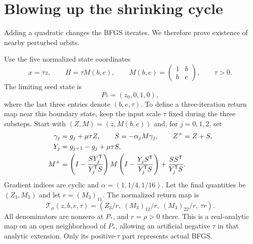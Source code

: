 \setcounter{section}{2}
\setcounter{theorem}{2}
\setcounter{lemma}{0}
\setcounter{corollary}{0}
\setcounter{proposition}{0}
\setcounter{remark}{0}
\setcounter{equation}{1}


\section{Blowing up the shrinking cycle}\label{L:sec:blowup}
Adding a quadratic changes the BFGS iterates. We therefore prove existence of nearby perturbed orbits.

Use the five normalized state coordinates
\[
 x=\tau z,\qquad H=\tau M(b,e),\qquad
 M(b,e)=\begin{pmatrix}1&b\\b&e\end{pmatrix},\qquad \tau>0.
\]
The limiting seed state is
\[
 P_*=(z_0,0,1,0),
\]
where the last three entries denote $(b,e,\tau)$. To define a three-iteration return map near this boundary state, keep the input scale $\tau$ fixed during the three substeps. Start with $(Z,M)=(z,M(b,e))$ and, for $j=0,1,2$, set
\begin{align}
 \gamma_j&=g_j+\mu\tau Z,\qquad
 S=-\alpha_jM\gamma_j,\qquad Z^+=Z+S,\label{L:eq:formal1}\\
 Y_j&=g_{j+1}-g_j+\mu\tau S,\label{L:eq:formal2}\\
 M^+&=\left(I-\frac{SY_j^{\mathsf T}}{Y_j^{\mathsf T} S}\right)M
 \left(I-\frac{Y_jS^{\mathsf T}}{Y_j^{\mathsf T} S}\right)
 +\frac{SS^{\mathsf T}}{Y_j^{\mathsf T} S}.
\end{align}
Gradient indices are cyclic and $\alpha=(1,1/4,1/16)$. Let the final quantities be $(Z_3,M_3)$ and let $r=(M_3)_{11}$. The normalized return map is
\begin{equation}\label{L:eq:return}
 \mathcal T_\mu(z,b,e,\tau)=
 \left(Z_3/r,\ (M_3)_{12}/r,\ (M_3)_{22}/r,\ \tau r\right).
\end{equation}
All denominators are nonzero at $P_*$, and $r=\rho>0$ there. This is a real-analytic map on an open neighborhood of $P_*$, allowing an artificial negative $\tau$ in that analytic extension. Only its positive-$\tau$ part represents actual BFGS.

